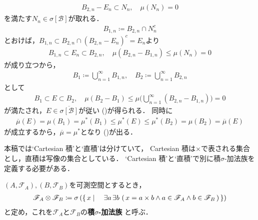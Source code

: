 \begin{prf}
\begin{description}
\begin{align}
						B_{2,n} - E_n \subset N_n, \quad \mu(N_n) = 0
					\end{align}
					を満たす$N_n \in \sigma[\mathcal{B}]$が取れる．
					\begin{align}
						B_{1,n} \coloneqq B_{2,n} \cap N_n^c
					\end{align}
					とおけば，$B_{1,n} \subset B_{2,n} \cap (B_{2,n} - E_n)^c = E_n$より
					\begin{align}
						B_{1,n} \subset E_n \subset B_{2,n},
						\quad \mu(B_{2,n} - B_{1,n}) \leq \mu(N_n) = 0
					\end{align}
					が成り立つから，
					\begin{align}
						B_1 \coloneqq \bigcup_{n=1}^\infty B_{1,n},
						\quad B_2 \coloneqq \bigcup_{n=1}^\infty B_{2,n}
					\end{align}
					として
					\begin{align}
						B_1 \subset E \subset B_2,
						\quad \mu(B_2 - B_1) \leq \mu\Biggl( \bigcup_{n=1}^\infty(B_{2,n} - B_{1,n}) \Biggr) = 0
					\end{align}
					が満たされ，$E \in \overline{\sigma[\mathcal{B}]}$が従い
					()が得られる．
					同時に
					\begin{align}
						\overline{\mu}(E) = \mu(B_1) = \mu^*(B_1)
						\leq \mu^*(E) \leq \mu^*(B_2) = \mu(B_2) = \overline{\mu}(E)
					\end{align}
					が成立するから，$\overline{\mu} = \mu^*$となり
					()が出る．
					\QED
			\end{description}
		\end{prf}
	
	本稿では`Cartesian 積'と`直積'は分けていて，
	Cartesian 積は$\times$で表される集合とし，直積は写像の集合としている．
	`Cartesian 積'と`直積'で別に積$\sigma$-加法族を定義する必要がある．
	\begin{screen}
		\begin{dfn}
			$(A,\mathscr{F}_A),(B,\mathscr{F}_B)$を可測空間とするとき，
			\begin{align}
				\mathscr{F}_A \otimes \mathscr{F}_B
				\coloneqq \sigma\left(\left\{\, x \mid \quad 
				\exists a\, \exists b\, 
				\left(\, x = a \times b \wedge a \in \mathscr{F}_A \wedge
				b \in \mathscr{F}_B\, \right)\, \right\} \right)
			\end{align}
			と定め，これを$\mathscr{F}_A$と$\mathscr{F}_B$の{\bf 積$\sigma$-加法族}
			と呼ぶ．
		\end{dfn}
	\end{screen}
	
